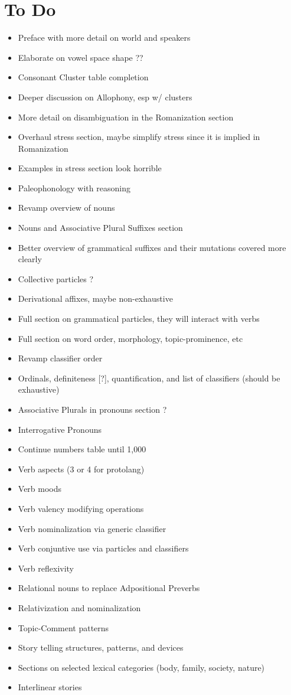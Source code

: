 \section{To Do}
\begin{itemize}
 \item Preface with more detail on world and speakers
 \item Elaborate on vowel space shape ??
 \item Consonant Cluster table completion
 \item Deeper discussion on Allophony, esp w/ clusters
 \item More detail on disambiguation in the Romanization section
 \item Overhaul stress section, maybe simplify stress since it is implied in Romanization
 \item Examples in stress section look horrible
 \item Paleophonology with reasoning
 \item Revamp overview of nouns
 \item Nouns and Associative Plural Suffixes section
 \item Better overview of grammatical suffixes and their mutations covered more clearly
 \item Collective particles ?
 \item Derivational affixes, maybe non-exhaustive
 \item Full section on grammatical particles, they will interact with verbs
 \item Full section on word order, morphology, topic-prominence, etc
 \item Revamp classifier order
 \item Ordinals, definiteness [?], quantification, and list of classifiers (should be exhaustive)
 \item Associative Plurals in pronouns section ?
 \item Interrogative Pronouns
 \item Continue numbers table until 1,000
 \item Verb aspects (3 or 4 for protolang)
 \item Verb moods
 \item Verb valency modifying operations
 \item Verb nominalization via generic classifier
 \item Verb conjuntive use via particles and classifiers
 \item Verb reflexivity
 \item Relational nouns to replace Adpositional Preverbs
 \item Relativization and nominalization
 \item Topic-Comment patterns
 \item Story telling structures, patterns, and devices
 \item Sections on selected lexical categories (body, family, society, nature)
 \item Interlinear stories
\end{itemize}
